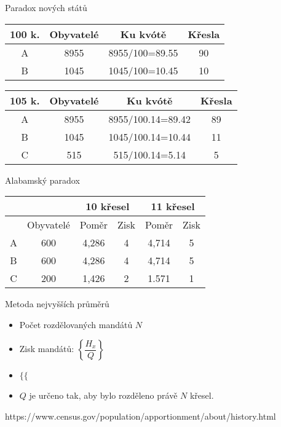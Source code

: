 \documentclass[17pt]{beamer}
\begin{document}
\begin{frame}{Paradox nových států}
\begin{center}
\begin{tabular}{|c|c|c|c|}
\hline 
100 k. & Obyvatelé & Ku kvótě & Křesla \\ 
\hline 
A & 8955 & \hspace{0.35cm}8955/100=89.55\hspace{0.35cm} & 90 \\ 
\hline 
B & 1045 & 1045/100=10.45 & 10 \\ 
\hline 
\end{tabular}
\end{center} 
\begin{center}
\begin{tabular}{|c|c|c|c|}
\hline 
105 k. & Obyvatelé & Ku kvótě & Křesla \\ 
\hline 
A & 8955 & 8955/100.14=89.42 & 89 \\ 
\hline 
B & 1045 & 1045/100.14=10.44 & 11 \\ 
\hline 
C & 515 & 515/100.14=5.14 & 5 \\ 
\hline 
\end{tabular} 
\end{center}
\end{frame}

\begin{frame}{Alabamský paradox}
\begin{center}
\begin{tabular}{|c|c|c|c|c|c|}
\hline 
 &  & \multicolumn{2}{c|}{10 křesel} & \multicolumn{2}{c|}{11 křesel} \\ 
\hline 
 & Obyvatelé & Poměr & Zisk & Poměr & Zisk \\ 
\hline 
A & 600 & 4,286 & 4 & 4,714 & 5 \\ 
\hline 
B & 600 & 4,286 & 4 & 4,714 & 5 \\ 
\hline 
C & 200 & 1,426 & 2 & 1.571 & 1 \\ 
\hline
\end{tabular} 
\end{center}
\end{frame}

\begin{frame}{Metoda nejvyšších průměrů}
\begin{itemize}
\item Počet rozdělovaných mandátů $N$
\item Zisk mandátů: $\left\{\dfrac{H_{x}}{Q}\right\}$
\item $\{$\hspace{0.25cm}$\{$
\item $Q$ je určeno tak, aby bylo rozděleno právě $N$ křesel.
\end{itemize}
\end{frame}

https://www.census.gov/population/apportionment/about/history.html
\end{document}
